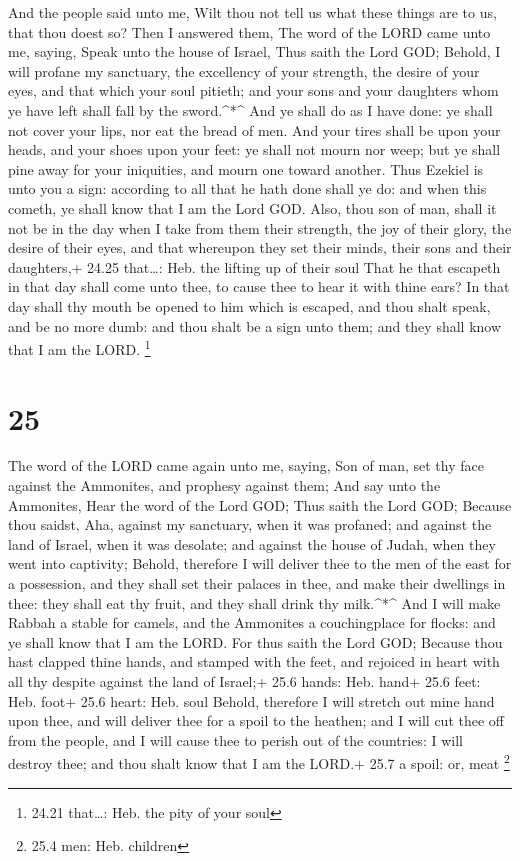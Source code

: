 And the people said unto me, Wilt thou not tell us what
these things are to us, that thou doest so?  Then I
answered them, The word of the LORD came unto me, saying, 
Speak unto the house of Israel, Thus saith the Lord GOD; Behold, I will
profane my sanctuary, the excellency of your strength, the desire of
your eyes, and that which your soul pitieth; and your sons and your
daughters whom ye have left shall fall by the sword.\^{}*\^{}
 And ye shall do as I have done: ye shall not cover your
lips, nor eat the bread of men.  And your tires shall be
upon your heads, and your shoes upon your feet: ye shall not mourn nor
weep; but ye shall pine away for your iniquities, and mourn one toward
another.  Thus Ezekiel is unto you a sign: according to all
that he hath done shall ye do: and when this cometh, ye shall know that
I am the Lord GOD.  Also, thou son of man, shall it not be
in the day when I take from them their strength, the joy of their glory,
the desire of their eyes, and that whereupon they set their minds, their
sons and their daughters,+ 24.25 that\ldots: Heb. the lifting up of
their soul  That he that escapeth in that day shall come
unto thee, to cause thee to hear it with thine ears?  In
that day shall thy mouth be opened to him which is escaped, and thou
shalt speak, and be no more dumb: and thou shalt be a sign unto them;
and they shall know that I am the LORD. \footnote{24.21 that\ldots: Heb.
  the pity of your soul}

\hypertarget{section-24}{%
\section{25}\label{section-24}}

 The word of the LORD came again unto me, saying,
 Son of man, set thy face against the Ammonites, and
prophesy against them;  And say unto the Ammonites, Hear the
word of the Lord GOD; Thus saith the Lord GOD; Because thou saidst, Aha,
against my sanctuary, when it was profaned; and against the land of
Israel, when it was desolate; and against the house of Judah, when they
went into captivity;  Behold, therefore I will deliver thee
to the men of the east for a possession, and they shall set their
palaces in thee, and make their dwellings in thee: they shall eat thy
fruit, and they shall drink thy milk.\^{}*\^{}  And I will
make Rabbah a stable for camels, and the Ammonites a couchingplace for
flocks: and ye shall know that I am the LORD.  For thus
saith the Lord GOD; Because thou hast clapped thine hands, and stamped
with the feet, and rejoiced in heart with all thy despite against the
land of Israel;+ 25.6 hands: Heb. hand+ 25.6 feet: Heb. foot+ 25.6
heart: Heb. soul  Behold, therefore I will stretch out mine
hand upon thee, and will deliver thee for a spoil to the heathen; and I
will cut thee off from the people, and I will cause thee to perish out
of the countries: I will destroy thee; and thou shalt know that I am the
LORD.+ 25.7 a spoil: or, meat \footnote{25.4 men: Heb. children}


